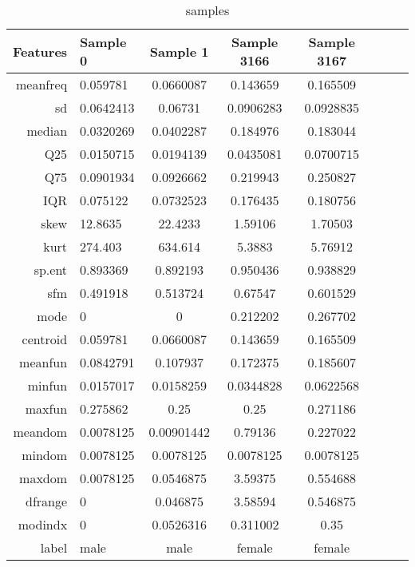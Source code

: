 \documentclass[12pt,a4paper]{article}
\theoremstyle{definition}
\begin{document}
\begin{table}[htbp]
    \centering
    \begin{tabular}{r|lcccccc}
        Features & Sample 0  & Sample 1   & Sample 3166 & Sample 3167 \\
        \hline
        meanfreq & 0.059781  & 0.0660087  & 0.143659    & 0.165509     & \\
        sd       & 0.0642413 & 0.06731    & 0.0906283   & 0.0928835    & \\
        median   & 0.0320269 & 0.0402287  & 0.184976    & 0.183044     & \\
        Q25      & 0.0150715 & 0.0194139  & 0.0435081   & 0.0700715    & \\
        Q75      & 0.0901934 & 0.0926662  & 0.219943    & 0.250827     & \\
        IQR      & 0.075122  & 0.0732523  & 0.176435    & 0.180756     & \\
        skew     & 12.8635   & 22.4233    & 1.59106     & 1.70503      & \\
        kurt     & 274.403   & 634.614    & 5.3883      & 5.76912      & \\
        sp.ent   & 0.893369  & 0.892193   & 0.950436    & 0.938829     & \\
        sfm      & 0.491918  & 0.513724   & 0.67547     & 0.601529     & \\
        mode     & 0         & 0          & 0.212202    & 0.267702     & \\
        centroid & 0.059781  & 0.0660087  & 0.143659    & 0.165509     & \\
        meanfun  & 0.0842791 & 0.107937   & 0.172375    & 0.185607     & \\
        minfun   & 0.0157017 & 0.0158259  & 0.0344828   & 0.0622568    & \\
        maxfun   & 0.275862  & 0.25       & 0.25        & 0.271186     & \\
        meandom  & 0.0078125 & 0.00901442 & 0.79136     & 0.227022     & \\
        mindom   & 0.0078125 & 0.0078125  & 0.0078125   & 0.0078125    & \\
        maxdom   & 0.0078125 & 0.0546875  & 3.59375     & 0.554688     & \\
        dfrange  & 0         & 0.046875   & 3.58594     & 0.546875     & \\
        modindx  & 0         & 0.0526316  & 0.311002    & 0.35         & \\
        label    & male      & male       & female      & female       & \\
    \end{tabular}
    \caption{\label{tab:sample_table}samples}
\end{table}
\end{document}
